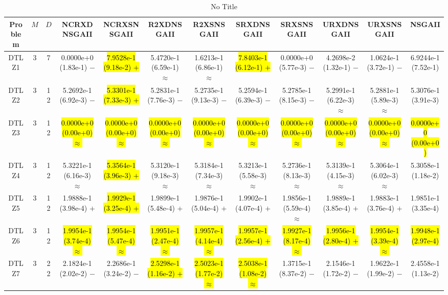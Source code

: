 \documentclass[journal]{IEEEtran}
\begin{document}
\begin{table*}[htbp]
\renewcommand{\arraystretch}{1.2}
\centering
\caption{No Title}
\begin{tabular}{cccccccccccc}
\toprule
Problem&$M$&$D$&NCRXDNSGAII&NCRXSNSGAII&R2XDNSGAII&R2XSNSGAII&SRXDNSGAII&SRXSNSGAII&URXDNSGAII&URXSNSGAII&NSGAII\\
\midrule
\multirow{1}{*}{DTLZ1}&3&7&0.0000e+0 (1.83e-1) $-$&\hl{7.9528e-1 (9.18e-2) $+$}&5.4720e-1 (6.59e-1) $\approx$&1.6213e-1 (6.86e-1) $\approx$&\hl{7.8403e-1 (6.12e-1) $+$}&0.0000e+0 (5.77e-3) $-$&4.2698e-2 (1.32e-1) $-$&1.0624e-1 (3.72e-1) $-$&6.9244e-1 (7.52e-1)\\
\hline
\multirow{1}{*}{DTLZ2}&3&12&5.2692e-1 (6.92e-3) $-$&\hl{5.3301e-1 (7.33e-3) $+$}&5.2831e-1 (7.76e-3) $-$&5.2735e-1 (9.13e-3) $-$&5.2594e-1 (6.39e-3) $-$&5.2785e-1 (8.15e-3) $-$&5.2991e-1 (6.22e-3) $\approx$&5.2881e-1 (5.89e-3) $\approx$&5.3076e-1 (3.91e-3)\\
\hline
\multirow{1}{*}{DTLZ3}&3&12&\hl{0.0000e+0 (0.00e+0) $\approx$}&\hl{0.0000e+0 (0.00e+0) $\approx$}&\hl{0.0000e+0 (0.00e+0) $\approx$}&\hl{0.0000e+0 (0.00e+0) $\approx$}&\hl{0.0000e+0 (0.00e+0) $\approx$}&\hl{0.0000e+0 (0.00e+0) $\approx$}&\hl{0.0000e+0 (0.00e+0) $\approx$}&\hl{0.0000e+0 (0.00e+0) $\approx$}&\hl{0.0000e+0 (0.00e+0)}\\
\hline
\multirow{1}{*}{DTLZ4}&3&12&5.3221e-1 (6.16e-3) $\approx$&\hl{5.3564e-1 (3.96e-3) $+$}&5.3120e-1 (9.18e-3) $\approx$&5.3184e-1 (7.34e-3) $\approx$&5.3213e-1 (5.58e-3) $\approx$&5.2736e-1 (8.13e-3) $\approx$&5.3139e-1 (4.15e-3) $\approx$&5.3064e-1 (6.02e-3) $\approx$&5.3058e-1 (1.18e-2)\\
\hline
\multirow{1}{*}{DTLZ5}&3&12&1.9888e-1 (3.98e-4) $+$&\hl{1.9929e-1 (3.25e-4) $+$}&1.9899e-1 (5.48e-4) $+$&1.9876e-1 (5.04e-4) $+$&1.9902e-1 (4.07e-4) $+$&1.9856e-1 (5.59e-4) $\approx$&1.9889e-1 (3.85e-4) $+$&1.9883e-1 (3.76e-4) $+$&1.9851e-1 (3.35e-4)\\
\hline
\multirow{1}{*}{DTLZ6}&3&12&\hl{1.9954e-1 (3.74e-4) $\approx$}&\hl{1.9954e-1 (5.47e-4) $\approx$}&\hl{1.9951e-1 (2.47e-4) $\approx$}&\hl{1.9957e-1 (4.14e-4) $\approx$}&\hl{1.9957e-1 (2.56e-4) $+$}&\hl{1.9927e-1 (8.17e-4) $\approx$}&\hl{1.9956e-1 (2.80e-4) $+$}&\hl{1.9954e-1 (3.39e-4) $\approx$}&\hl{1.9948e-1 (2.97e-4)}\\
\hline
\multirow{1}{*}{DTLZ7}&3&22&2.1824e-1 (2.02e-2) $-$&2.2686e-1 (3.24e-2) $-$&\hl{2.5298e-1 (1.16e-2) $+$}&\hl{2.5023e-1 (1.77e-2) $\approx$}&\hl{2.5038e-1 (1.08e-2) $\approx$}&1.3715e-1 (8.37e-2) $-$&2.1546e-1 (1.72e-2) $-$&1.9622e-1 (1.99e-2) $-$&2.4558e-1 (1.13e-2)\\

\end{tabular}
\end{table*}
\end{document}
